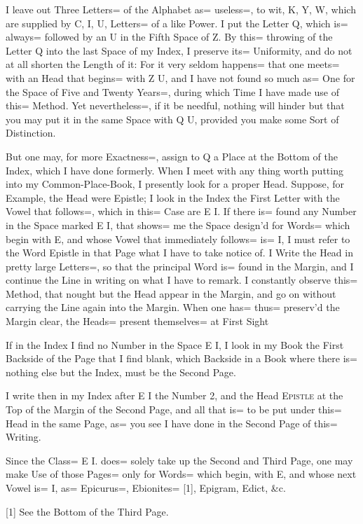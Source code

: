 I leave out Three Letters= of the Alphabet as= useless=, to wit, K, Y, W, which are supplied by C, I, U, Letters= of a like Power.
I put the Letter Q, which is= always= followed by an U in the Fifth Space of Z.
By this= throwing of the Letter Q into the last Space of my Index, I preserve its= Uniformity, and do not at all shorten the Length of it:
For it very seldom happens= that one meets= with an Head that begins= with Z U, and I have not found so much as= One for the Space of Five and Twenty Years=, during which Time I have made use of this= Method.
Yet nevertheless=, if it be needful, nothing will hinder but that you may put it in the same Space with Q U, provided you make some Sort of Distinction.

But one may, for more Exactness=, assign to Q a Place at the Bottom of the Index, which I have done formerly.
When I meet with any thing worth putting into my Common-Place-Book, I presently look for a proper Head.
Suppose, for Example, the Head were Epistle;
I look in the Index the First Letter with the Vowel that follows=, which in this= Case are E I.
If there is= found any Number in the Space marked E I, that shows= me the Space design'd for Words= which begin with E, and whose Vowel that immediately follows= is= I, I must refer to the Word Epistle in that Page what I have to take notice of.
I Write the Head in pretty large Letters=, so that the principal Word is= found in the Margin, and I continue the Line in writing on what I have to remark.
I constantly observe this= Method, that nought but the Head appear in the Margin, and go on without carrying the Line again into the Margin.
When one has= thus= preserv'd the Margin clear, the Heads= present themselves= at First Sight

If in the Index I find no Number in the Space E I, I look in my Book the First Backside of the Page that I find blank, which Backside in a Book where there is= nothing else but the Index, must be the Second Page.

I write then in my Index after E I the Number 2, and the Head \textsc{Epistle} at the Top of the Margin of the Second Page, and all that is= to be put under this= Head in the same Page, as= you see I have done in the Second Page of this= Writing.

Since the Class= E I.
does= solely take up the Second and Third Page, one may make Use of those Pages= only for Words= which begin, with E, and whose next Vowel is= I, as= Epicurus=, Ebionites= [1], Epigram, Edict, \&c.

[1]
See the Bottom of the Third Page.

